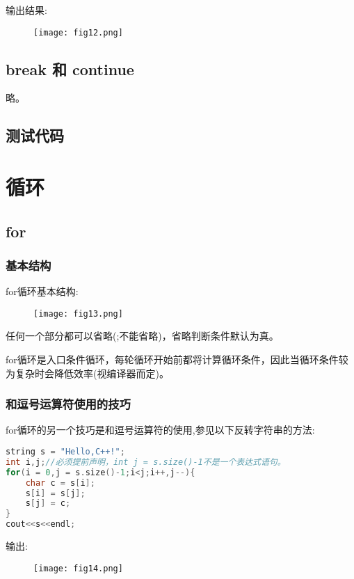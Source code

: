 \documentclass{article}
\begin{document}
    输出结果:
    \begin{figure}[H]
        \centering
        \texttt{[image: fig12.png]}
    \end{figure}

    \subsection{break 和 continue}
    略。

    \subsection{测试代码}
    

    \section{循环}
    \subsection{for}
    \subsubsection{基本结构}
    for循环基本结构:
    \begin{figure}[H]
        \centering
        \texttt{[image: fig13.png]}
    \end{figure}
    任何一个部分都可以省略(;不能省略)，省略判断条件默认为真。

    for循环是入口条件循环，每轮循环开始前都将计算循环条件，因此当循环条件较为复杂时会降低效率(视编译器而定)。

    \subsubsection{和逗号运算符使用的技巧}
    for循环的另一个技巧是和逗号运算符的使用,参见以下反转字符串的方法:
    \begin{lstlisting}[language=c++]
string s = "Hello,C++!";
int i,j;//必须提前声明，int j = s.size()-1不是一个表达式语句。
for(i = 0,j = s.size()-1;i<j;i++,j--){
    char c = s[i];
    s[i] = s[j];
    s[j] = c;
}
cout<<s<<endl;  
    \end{lstlisting}
    输出:
    \begin{figure}[H]
        \centering
        \texttt{[image: fig14.png]}
    \end{figure}
\end{document}
